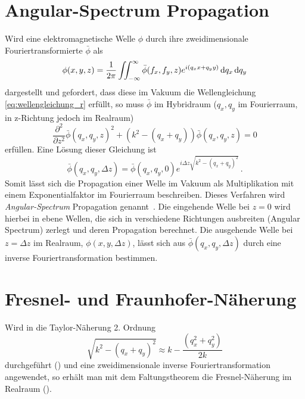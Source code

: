 \section{Angular-Spectrum Propagation}
Wird eine elektromagnetische Welle $\phi$ durch ihre zweidimensionale Fouriertransformierte $\bar{\phi}$ als
\begin{equation}
	\phi(x,y,z)=\frac{1}{2\pi}\iint_{-\infty}^{\infty}\bar{\phi}(f_x,f_y,z)e^{i(q_xx+q_yy)} \dif q_x \dif q_y
\end{equation}dargestellt und gefordert, dass diese im Vakuum die Wellengleichung \eqref{eq:wellengleichung_r} erfüllt,
so muss $\bar{\phi}$ im Hybridraum ($q_x,q_y$ im Fourierraum, in z-Richtung jedoch im Realraum)
\begin{equation}
	\label{eq:wellengleichung_h}
	\frac{\partial ^2}{\partial z^2}\bar{\phi}(q_x,q_y,z)^2+ \left(k^2-\left(q_x+q_y\right)\right)\bar{\phi}(q_x,q_y,z)=0
\end{equation}
erfüllen. Eine Lösung dieser Gleichung ist
\begin{equation}
	\label{eq:angularspectrum}
	\bar{\phi}\left(q_x,q_y,\Delta z\right)=\bar{\phi}(q_x,q_y,0)e^{i\Delta z\sqrt{k^2-(q_x+q_y)^2}}\, . 
\end{equation}
Somit lässt sich die Propagation einer Welle im Vakuum als Multiplikation mit einem Exponentialfaktor im Fourierraum beschreiben. Dieses Verfahren wird \textit{Angular-Spectrum} Propagation genannt~\cite{goodman2005}. Die eingehende Welle bei $z=0$ wird hierbei in ebene Wellen, die sich in verschiedene Richtungen ausbreiten (Angular Spectrum) zerlegt und deren Propagation berechnet. Die ausgehende Welle bei $z=\Delta z$ im Realraum, $\phi\left(x,y,\Delta z\right)$, lässt sich aus $\bar{\phi}\left(q_x,q_y,\Delta z\right)$ durch eine inverse Fouriertransformation bestimmen.


\section{Fresnel- und Fraunhofer-Näherung}
\label{chap:fraunhofer}
Wird in  die Taylor-Näherung 2. Ordnung
\begin{equation}
	\sqrt{k^2-(q_x+q_y)^2}\approx k-\frac{(q_x^2+q_y^2)}{2k}
\end{equation}
durchgeführt () und eine zweidimensionale inverse Fouriertransformation angewendet, so erhält man mit dem Faltungstheorem die Fresnel-Näherung im Realraum ().

